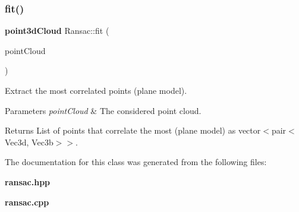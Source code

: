 \subsubsection{fit()}
{\footnotesize\ttfamily \textbf{ point3d\+Cloud} Ransac\+::fit (\begin{DoxyParamCaption}\item[{\textbf{ point3d\+Cloud}}]{point\+Cloud }\end{DoxyParamCaption})}

Extract the most correlated points (plane model).


\begin{DoxyParams}{Parameters}
{\em point\+Cloud} & The considered point cloud. \\
\hline
\end{DoxyParams}
\begin{DoxyReturn}{Returns}
List of points that correlate the most (plane model) as vector$<$pair$<$\+Vec3d, Vec3b$>$$>$. 
\end{DoxyReturn}


The documentation for this class was generated from the following files\+:\begin{DoxyCompactItemize}
\item 
\textbf{ ransac.\+hpp}\item 
\textbf{ ransac.\+cpp}\end{DoxyCompactItemize}
